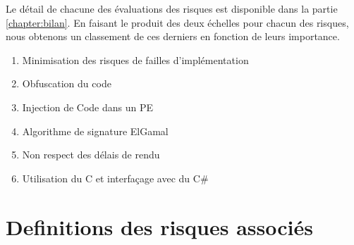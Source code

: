 \bigskip

Le détail de chacune des évaluations des risques est disponible dans la partie \ref{chapter:bilan}.\newline
En faisant le produit des deux échelles pour chacun des risques, nous obtenons un classement
de ces derniers en fonction de leurs importance.\\

\begin{enumerate}
	\item Minimisation des risques de failles d'implémentation
	\item Obfuscation du code  
	\item Injection de Code dans un PE
	\item Algorithme de signature ElGamal
	\item Non respect des délais de rendu
	\item Utilisation du C et interfaçage avec du C\# 
\end{enumerate}

\chapter{Definitions des risques associés}

